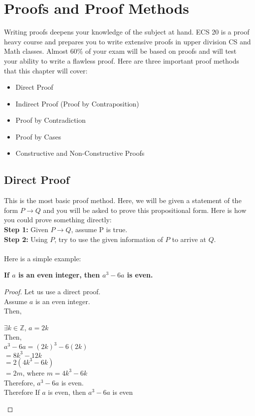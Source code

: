 \chapter{Proofs and Proof Methods}
Writing proofs deepens your knowledge of the subject at hand. ECS 20 is a proof
heavy course and prepares you to write extensive proofs in upper division CS
and Math classes. Almost 60\% of your exam will be based on proofs and will
test your ability to write a flawless proof. Here are three important proof
methods that this chapter will cover:
\begin{itemize}
    \item Direct Proof
    \item Indirect Proof (Proof by Contraposition)
    \item Proof by Contradiction
    \item Proof by Cases
    \item Constructive and Non-Constructive Proofs
\end{itemize}
\section{Direct Proof}
This is the most basic proof method. Here, we will be given a statement of the
form $ P \rightarrow Q $ and you will be asked to prove this propositional
form. Here is how you could prove something directly: \\
\indent \textbf{Step 1:} Given $P \rightarrow Q$, assume P is true. \\
\indent \textbf{Step 2:} Using $P$, try to use the given information of $P$ to
arrive at $Q$. \\ \\
Here is a simple example:
\begin{center}
    \textbf{If $a$ is an even integer, then $a^{3} - 6a$ is even.}
\end{center}
\begin{proof}
Let us use a direct proof. \\
Assume $a$ is an even integer. \\
Then,
\begin{center}
    $\exists k \in \mathbb{Z}$, $a = 2k$ \\
    Then, \\
     $a^{3} - 6a = (2k)^{3} - 6(2k)$  \\
     $ = 8k^{3} - 12k$ \\
     $ = 2(4k^{3} - 6k)$ \\
     $ = 2m $, where $ m = 4k^{3} - 6k $ \\
     Therefore, $a^{3} - 6a$ is even. \\
     Therefore If $a$ is even, then $a^{3} -6a$ is even
\end{center}
\end{proof}
